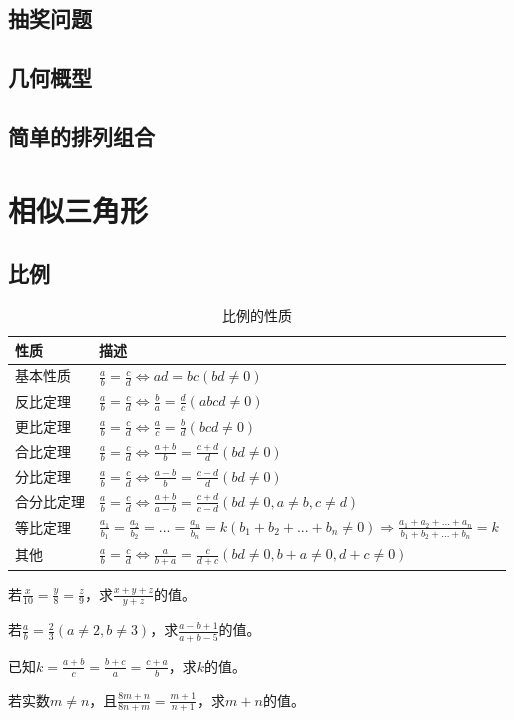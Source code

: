 \documentclass{ecnuthesis}
\begin{document}
\section{抽奖问题}
\clearpage
\section{几何概型}
\clearpage
\section{简单的排列组合}
\clearpage
\chapter{相似三角形}
\section{比例}
\begin{table}[H]
\centering
\caption{比例的性质}
\begin{tabular}{l|p{12cm}}
\hline
\hline
性质 & 描述 \\
\hline
基本性质 & $ \frac{a}{b}=\frac{c}{d}\Leftrightarrow ad=bc(bd \ne 0) $ \\
\hline
反比定理 & $ \frac{a}{b}=\frac{c}{d}\Leftrightarrow \frac{b}{a}=\frac{d}{c}(abcd \ne 0) $ \\
\hline
更比定理 & $ \frac{a}{b}=\frac{c}{d}\Leftrightarrow \frac{a}{c}=\frac{b}{d}(bcd \ne 0) $ \\
\hline
合比定理 & $ \frac{a}{b}=\frac{c}{d}\Leftrightarrow \frac{a+b}{b}=\frac{c+d}{d}(bd \ne 0) $ \\
\hline
分比定理 & $ \frac{a}{b}=\frac{c}{d}\Leftrightarrow \frac{a-b}{b}=\frac{c-d}{d}(bd \ne 0) $ \\
\hline
合分比定理 & $ \frac{a}{b}=\frac{c}{d}\Leftrightarrow \frac{a+b}{a-b}=\frac{c+d}{c-d}(bd \ne 0,a\ne b,c\ne d) $ \\
\hline
等比定理 & $ \frac{a_1}{b_1}=\frac{a_2}{b_2}=...=\frac{a_n}{b_n}=k(b_1+b_2+...+b_n\ne 0)\Rightarrow \frac{a_1+a_2+...+a_n}{b_1+b_2+...+b_n}=k $ \\
\hline
其他 & $\frac{a}{b}=\frac{c}{d}\Leftrightarrow \frac{a}{b+a}=\frac{c}{d+c}(bd \ne 0,b+a\ne 0,d+c \ne 0)$ \\
\hline
\hline
\end{tabular}
\end{table}
\begin{problem}
    若$\frac{x}{10}=\frac{y}{8}=\frac{z}{9}$，求$\frac{x+y+z}{y+z}$的值。\\
\end{problem}
\begin{problem}
    若$\frac{a}{b}=\frac{2}{3}(a\ne 2,b\ne 3)$，求$\frac{a-b+1}{a+b-5}$的值。\\
\end{problem}
\begin{problem}
    已知$k=\frac{a+b}{c}=\frac{b+c}{a}=\frac{c+a}{b}$，求$k$的值。\\
\end{problem}
\begin{problem}
    若实数$m\ne n$，且$\frac{8m+n}{8n+m}=\frac{m+1}{n+1}$，求$m+n$的值。 \\
\end{problem}
\clearpage
\end{document}
